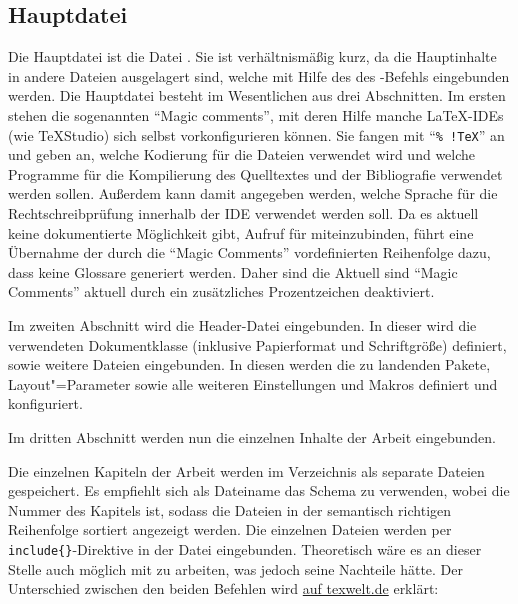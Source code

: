 \subsection[Hauptdatei Diss.tex]{Hauptdatei }%
%
\label{sec:Hauptdatei}
%
Die Hauptdatei ist die Datei .
Sie ist verhältnismäßig kurz, da die Hauptinhalte in andere Dateien ausgelagert sind, welche mit Hilfe des  \bzw des -Befehls eingebunden werden.
Die Hauptdatei besteht im Wesentlichen aus drei Abschnitten.
Im ersten stehen die sogenannten \enquote{Magic comments}, mit deren Hilfe manche \LaTeX-IDEs (wie \zB TeXStudio) sich selbst vorkonfigurieren können.
Sie fangen mit \enquote{\texttt{\%~!TeX}} an und geben an, welche Kodierung für die Dateien verwendet wird und welche Programme für die Kompilierung des Quelltextes und der Bibliografie verwendet werden sollen.
Außerdem kann damit angegeben werden, welche Sprache für die Rechtschreibprüfung innerhalb der IDE verwendet werden soll.
Da es aktuell keine dokumentierte Möglichkeit gibt, Aufruf für  miteinzubinden,
führt eine Übernahme der durch die \enquote{Magic Comments} vordefinierten Reihenfolge dazu, dass keine Glossare generiert werden.
Daher sind die Aktuell sind \enquote{Magic Comments} aktuell durch ein zusätzliches Prozentzeichen deaktiviert.

Im zweiten Abschnitt wird die Header-Datei eingebunden.
In dieser wird die verwendeten Dokumentklasse (inklusive Papierformat und Schriftgröße) definiert, sowie weitere Dateien eingebunden.
In diesen werden die zu landenden Pakete, Layout"=Parameter sowie alle weiteren Einstellungen und Makros definiert und konfiguriert.

Im dritten Abschnitt werden nun die einzelnen Inhalte der Arbeit eingebunden.

Die einzelnen Kapiteln der Arbeit werden im Verzeichnis  als separate Dateien gespeichert.
Es empfiehlt sich als Dateiname das Schema  zu verwenden, wobei  die Nummer des Kapitels ist,
sodass die Dateien in der semantisch richtigen Reihenfolge sortiert angezeigt werden.
Die einzelnen Dateien werden per \verb+include{}+-Direktive in der Datei  eingebunden.
Theoretisch wäre es an dieser Stelle auch möglich mit \verb++ zu arbeiten, was jedoch seine Nachteile hätte.
Der Unterschied zwischen den beiden Befehlen wird \href{https://texwelt.de/wissen/fragen/32/was-ist-der-unterschied-zwischen-include-and-input}{auf texwelt.de} erklärt:

